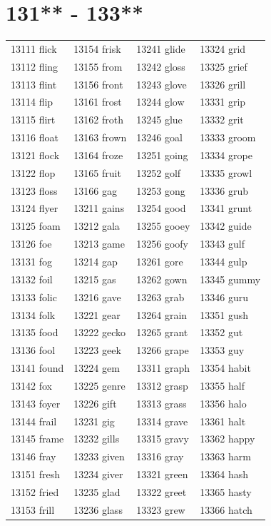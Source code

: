 \documentclass[10pt, oneside]{book}
\begin{document}
\begin{table}
	\centering
	\section*{131** - 133**}
	\begin{tabular}{l l l l}
13111 flick &13154 frisk &13241 glide &13324 grid\\
13112 fling &13155 from &13242 gloss &13325 grief\\
13113 flint &13156 front &13243 glove &13326 grill\\
13114 flip &13161 frost &13244 glow &13331 grip\\
13115 flirt &13162 froth &13245 glue &13332 grit\\
13116 float &13163 frown &13246 goal &13333 groom\\
13121 flock &13164 froze &13251 going &13334 grope\\
13122 flop &13165 fruit &13252 golf &13335 growl\\
13123 floss &13166 gag &13253 gong &13336 grub\\
13124 flyer &13211 gains &13254 good &13341 grunt\\
13125 foam &13212 gala &13255 gooey &13342 guide\\
13126 foe &13213 game &13256 goofy &13343 gulf\\
13131 fog &13214 gap &13261 gore &13344 gulp\\
13132 foil &13215 gas &13262 gown &13345 gummy\\
13133 folic &13216 gave &13263 grab &13346 guru\\
13134 folk &13221 gear &13264 grain &13351 gush\\
13135 food &13222 gecko &13265 grant &13352 gut\\
13136 fool &13223 geek &13266 grape &13353 guy\\
13141 found &13224 gem &13311 graph &13354 habit\\
13142 fox &13225 genre &13312 grasp &13355 half\\
13143 foyer &13226 gift &13313 grass &13356 halo\\
13144 frail &13231 gig &13314 grave &13361 halt\\
13145 frame &13232 gills &13315 gravy &13362 happy\\
13146 fray &13233 given &13316 gray &13363 harm\\
13151 fresh &13234 giver &13321 green &13364 hash\\
13152 fried &13235 glad &13322 greet &13365 hasty\\
13153 frill &13236 glass &13323 grew &13366 hatch\\
	\end{tabular}
 \end{table}
\clearpage
\end{document}
